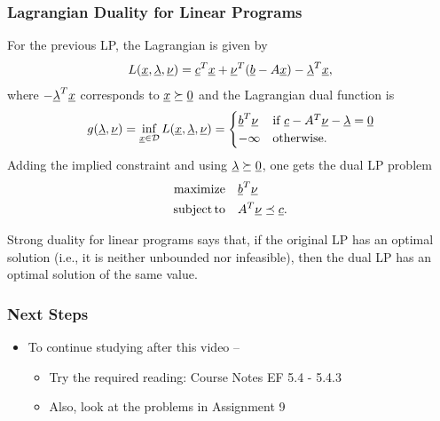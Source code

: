 \documentclass[10pt,english,hide notes,aspectratio=169]{beamer}
\begin{document}
\begin{frame} \frametitle{Lagrangian Duality for Linear Programs}

For the previous LP, the Lagrangian is given by
	\[ L(\underline{x},\underline{\lambda},\underline{\nu}) = \underline{c}^T \underline{x} + \underline{\nu}^T (\underline{b} - A\underline{x}) - \underline{\lambda}^T \underline{x}, \]
	where $-\underline{\lambda}^T \underline{x}$ corresponds to $\underline{x} \succeq \underline{0}$ and the Lagrangian dual function is \vspace{-1.5mm}
\begin{equation*}
g(\underline{\lambda},\underline{\nu})
= \inf_{\underline{x}\in \mathcal{D}} L(\underline{x},\underline{\lambda},\underline{\nu})
	= \begin{cases} \underline{b}^T \underline{\nu} & \text{if } \underline{c} - A^T \underline{\nu} - \underline{\lambda} = \underline{0} \\
-\infty & \text{otherwise}. \end{cases}
\end{equation*}
Adding the implied constraint and using $\underline{\lambda} \succeq \underline{0}$, one gets the dual LP problem
\begin{align*}
\mathrm{maximize} \quad & \underline{b}^T \underline{\nu} \\
	\mathrm{subject\,to} \quad & A^T \underline{\nu} \preceq \underline{c}.
\end{align*}

\vspace{1mm}
Strong duality for linear programs says that, if the original LP has an optimal solution (i.e., it is neither unbounded nor infeasible), then the dual LP has an optimal solution of the same value.

\end{frame}

\begin{frame} \frametitle{Next Steps}

\begin{itemize}
\setlength\itemsep{5mm}
\item To continue studying after this video -- \vspace{2mm}

\begin{itemize}
 \setlength\itemsep{3mm}
 
 \item Try the required reading:  Course Notes EF 5.4 - 5.4.3

 \item Also, look at the problems in Assignment 9
\end{itemize}
\end{itemize}


\end{frame}
\end{document}

